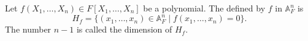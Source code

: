 Let $f(X_1, \ldots, X_n) \in F[X_1, \ldots, X_n]$ be a polynomial. The  defined by $f$ in $\mathbb{A}_F^n$ is $$H_f = \{(x_1, \ldots, x_n) \in \mathbb{A}_F^n \mid f(x_1, \ldots, x_n) = 0\}.$$ The number $n-1$ is called the dimension of $H_f$.
